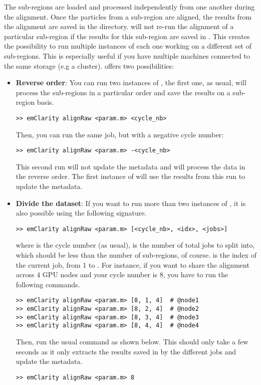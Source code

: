 The sub-regions are loaded and processed independently from one another during the alignment. Once the particles from a sub-region are aligned, the results from the alignment are saved in the  directory. {\emClarity} will not re-run the alignment of a particular sub-region if the results for this sub-region are saved in . This creates the possibility to run multiple instances of {\emClarity} each one working on a different set of sub-regions. This is especially useful if you have multiple machines connected to the same storage (e.g a cluster). {\emClarity} offers two possibilities:
\begin{itemize}
    \item \textbf{Reverse order}: You can run two instances of {\emClarity}, the first one, as usual, will process the sub-regions in a particular order and save the results on a sub-region basis.
\begin{lstlisting}
>> emClarity alignRaw <param.m> <cycle_nb>
\end{lstlisting}
    Then, you can run the same job, but with a negative cycle number:
\begin{lstlisting}
>> emClarity alignRaw <param.m> -<cycle_nb>
\end{lstlisting}
    This second run will not update the metadata and will process the data in the reverse order. The first instance of {\emClarity} will use the results from this run to update the metadata.
    
    \item \textbf{Divide the dataset}: If you want to run more than two instances of {\emClarity}, it is also possible using the following signature.
\begin{lstlisting}
>> emClarity alignRaw <param.m> [<cycle_nb>, <idx>, <jobs>]
\end{lstlisting}
    where  is the cycle number (as usual),  is the number of total jobs to split into, which should be less than the number of sub-regions, of course.  is the index of the current job, from 1 to . For instance, if you want to share the alignment across 4 GPU nodes and your cycle number is 8, you have to run the following commands.
\begin{lstlisting}
>> emClarity alignRaw <param.m> [8, 1, 4]  # @node1
>> emClarity alignRaw <param.m> [8, 2, 4]  # @node2
>> emClarity alignRaw <param.m> [8, 3, 4]  # @node3
>> emClarity alignRaw <param.m> [8, 4, 4]  # @node4
\end{lstlisting}
    Then, run the usual command as shown below. This should only take a few seconds as it only extracts the results saved in  by the different jobs and update the metadata.
\begin{lstlisting}
>> emClarity alignRaw <param.m> 8
\end{lstlisting}
    
\end{itemize}



